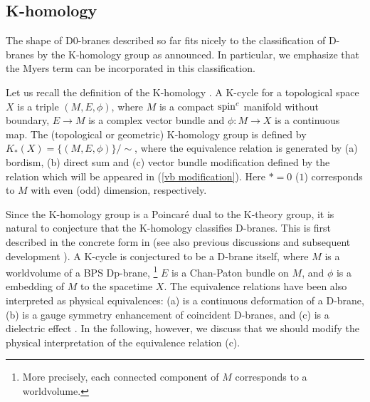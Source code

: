 \documentclass[12pt]{article}
\numberwithin{equation}{section}
\begin{document}
\subsection{K-homology}

The shape of D0-branes described so far
fits nicely to the classification of D-branes by the K-homology group as announced.
In particular, we emphasize that 
the Myers term can be incorporated in this classification.

Let us recall the definition of the K-homology {\cite{Douglas1982}}.
A K-cycle for a topological space $X$ is a triple $(M,E,\phi)$, 
where $M$ is a compact ${\rm spin}^c$ manifold without boundary, 
$E \to M $ is a complex vector bundle and 
$\phi:M\to X$ is a continuous map.
The (topological or geometric) K-homology group is defined by 
$K_*(X)=\{(M,E,\phi)\}/\sim$, where the equivalence relation is generated by 
(a) bordism, (b) direct sum and 
(c) vector bundle modification
defined by the relation which will be appeared in (\ref{vb modification}).
Here $\ast=0$ ($1$) corresponds to $M$ with even (odd) dimension, respectively.

Since the K-homology group is a Poincar\'e dual to the K-theory group,
it is natural to conjecture that the K-homology classifies D-branes.
This is first described in the concrete form in \cite{Asakawa2002} 
(see also previous discussions {\cite{Periwal2000,Moore2001}} 
and subsequent development {\cite{SZABO2002,Reis2006,Jia2013}}).
A K-cycle is conjectured to be a D-brane itself,
where $M$ is a worldvolume of a BPS Dp-brane,%
\footnote{More precisely, each connected component of $M$ corresponds to a worldvolume.}
$E$ is a Chan-Paton bundle on $M$,
and $\phi$ is a embedding of $M$ to the spacetime $X$.
The equivalence relations have been 
also interpreted as physical equivalences: 
(a) is a continuous deformation of a D-brane, 
(b) is a gauge symmetry enhancement of coincident D-branes, 
and (c) is a dielectric effect \cite{Asakawa2002,SZABO2002,Reis2006}.
In the following, however, we discuss that we should modify the physical interpretation of the equivalence relation (c).
\end{document}
